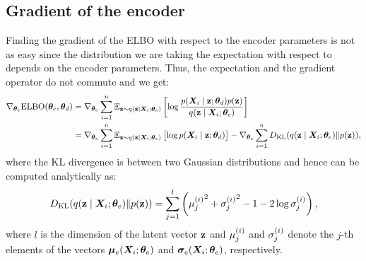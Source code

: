 \subsection{Gradient of the encoder}
Finding the gradient of the ELBO with respect to the encoder parameters is not as easy since the distribution we are taking the expectation with respect to depends on the encoder parameters. Thus, the expectation and the gradient operator do not commute and we get:
\begin{align}
    \nabla_{{\bm{\theta}}_e} \mathrm{ELBO}({\bm{\theta}}_e, {\bm{\theta}}_d) &= \nabla_{{\bm{\theta}}_e} \sum_{i=1}^n \mathbb{E}_{{\mathbf{z}} \sim q({\mathbf{z}} \mid {\bm{X}}_i; {\bm{\theta}}_e)} \left[\log \frac{p({\bm{X}}_i \mid {\mathbf{z}}; {\bm{\theta}}_d)p({\mathbf{z}})}{q({\mathbf{z}} \mid {\bm{X}}_i; {\bm{\theta}}_e)} \right] \nonumber\\
    &= \nabla_{{\bm{\theta}}_e} \sum_{i=1}^n \mathbb{E}_{{\mathbf{z}} \sim q({\mathbf{z}} \mid {\bm{X}}_i; {\bm{\theta}}_e)} \left[\log p({\bm{X}}_i \mid {\mathbf{z}}; {\bm{\theta}}_d) \right] - \nabla_{{\bm{\theta}}_e} \sum_{i=1}^n D_{\mathrm{KL}}(q({\mathbf{z}} \mid {\bm{X}}_i; {\bm{\theta}}_e) \Vert p({\mathbf{z}})) \label{eq:vae_encoder_grad},
\end{align}
where the KL divergence is between two Gaussian distributions and hence can be computed analytically as:
\begin{equation}
    \label{eq:vae_kl}
    D_{\mathrm{KL}}(q({\mathbf{z}} \mid {\bm{X}}_i; {\bm{\theta}}_e) \Vert p({\mathbf{z}})) = \sum_{j=1}^l \left({{\mu}_j^{(i)}}^2 + {{\sigma}_j^{(i)}}^2 -1 -2\log {{\sigma}_j^{(i)}}\right),
\end{equation}
where $l$ is the dimension of the latent vector ${\mathbf{z}}$ and ${\mu}_j^{(i)}$ and ${\sigma}_j^{(i)}$ denote the $j$-th elements of the vectors ${\bm{\mu}}_e({\bm{X}}_i; {\bm{\theta}}_e)$ and ${\bm{\sigma}}_e({\bm{X}}_i; {\bm{\theta}}_e)$, respectively.


